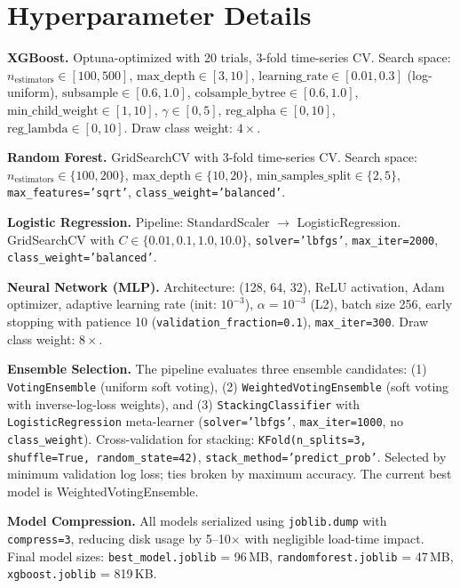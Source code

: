 \documentclass[11pt,a4paper]{article}
\begin{document}
\section{Hyperparameter Details}
\label{sec:hyperparams}

\textbf{XGBoost.} Optuna-optimized with 20 trials, 3-fold time-series CV. Search space: $n_\text{estimators} \in [100, 500]$, $\text{max\_depth} \in [3, 10]$, $\text{learning\_rate} \in [0.01, 0.3]$ (log-uniform), $\text{subsample} \in [0.6, 1.0]$, $\text{colsample\_bytree} \in [0.6, 1.0]$, $\text{min\_child\_weight} \in [1, 10]$, $\gamma \in [0, 5]$, $\text{reg\_alpha} \in [0, 10]$, $\text{reg\_lambda} \in [0, 10]$. Draw class weight: $4\times$.

\textbf{Random Forest.} GridSearchCV with 3-fold time-series CV. Search space: $n_\text{estimators} \in \{100, 200\}$, $\text{max\_depth} \in \{10, 20\}$, $\text{min\_samples\_split} \in \{2, 5\}$, \texttt{max\_features='sqrt'}, \texttt{class\_weight='balanced'}.

\textbf{Logistic Regression.} Pipeline: StandardScaler $\to$ LogisticRegression. GridSearchCV with $C \in \{0.01, 0.1, 1.0, 10.0\}$, \texttt{solver='lbfgs'}, \texttt{max\_iter=2000}, \texttt{class\_weight='balanced'}.

\textbf{Neural Network (MLP).} Architecture: (128, 64, 32), ReLU activation, Adam optimizer, adaptive learning rate (init: $10^{-3}$), $\alpha = 10^{-3}$ (L2), batch size 256, early stopping with patience 10 (\texttt{validation\_fraction=0.1}), \texttt{max\_iter=300}. Draw class weight: $8\times$.

\textbf{Ensemble Selection.} The pipeline evaluates three ensemble candidates: (1) \texttt{VotingEnsemble} (uniform soft voting), (2) \texttt{WeightedVotingEnsemble} (soft voting with inverse-log-loss weights), and (3) \texttt{StackingClassifier} with \texttt{LogisticRegression} meta-learner (\texttt{solver='lbfgs'}, \texttt{max\_iter=1000}, no \texttt{class\_weight}). Cross-validation for stacking: \texttt{KFold(n\_splits=3, shuffle=True, random\_state=42)}, \texttt{stack\_method='predict\_prob'}. Selected by minimum validation log loss; ties broken by maximum accuracy. The current best model is WeightedVotingEnsemble.

\textbf{Model Compression.} All models serialized using \texttt{joblib.dump} with \texttt{compress=3}, reducing disk usage by 5--10$\times$ with negligible load-time impact. Final model sizes: \texttt{best\_model.joblib} = 96\,MB, \texttt{randomforest.joblib} = 47\,MB, \texttt{xgboost.joblib} = 819\,KB.
\end{document}
